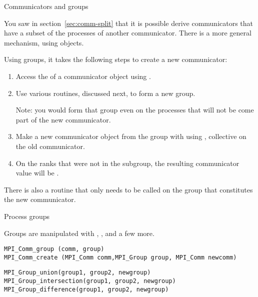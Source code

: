 
 {Communicators and groups}
\label{sec:mpi-comm-group}

You saw in section~\ref{sec:comm-split} that it is possible derive
communicators that have a subset of the processes of another communicator.
There is a more general mechanism, using 
objects.

Using groups, it takes the following steps to create a new communicator:
\begin{enumerate}
\item Access the  of a communicator
  object using .
\item Use various routines, discussed next, to form a new group.

  Note: you would form that group even on the processes that will not
  be come part of the new communicator.
\item Make a new communicator object from the group with using
  , collective on the old communicator.
\item On the ranks that were not in the subgroup, the resulting
  communicator value will be .
\end{enumerate}

There is also a routine  that only
needs to be called on the group that constitutes the new communicator.

 {Process groups}
\label{sec:comm-group}

Groups are manipulated with
,
,
 and a few more.

\begin{lstlisting}
MPI_Comm_group (comm, group)
MPI_Comm_create (MPI_Comm comm,MPI_Group group, MPI_Comm newcomm)
\end{lstlisting}

\begin{lstlisting}
MPI_Group_union(group1, group2, newgroup)
MPI_Group_intersection(group1, group2, newgroup)
MPI_Group_difference(group1, group2, newgroup)
\end{lstlisting}

